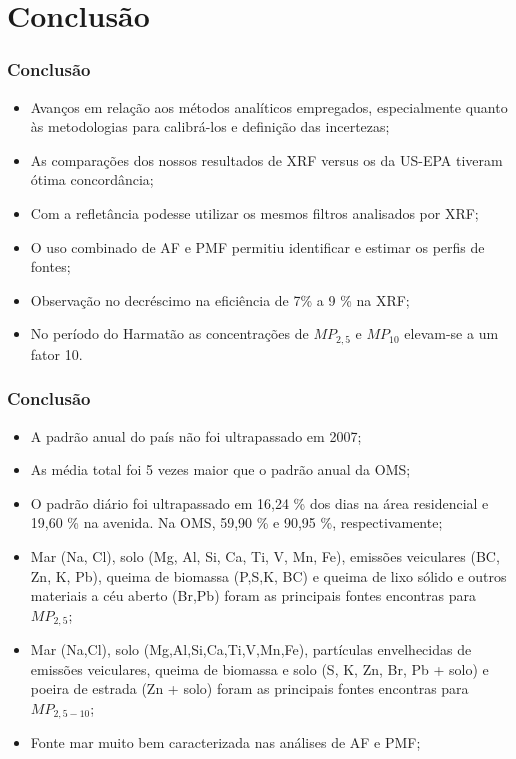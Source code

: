 \section{Conclusão}

\begin{frame}
  \frametitle{Conclusão}
  \begin{itemize}
    \item Avanços em relação aos métodos analíticos empregados, especialmente quanto às metodologias para calibrá-los e definição das incertezas;
    \item As comparações dos nossos resultados de XRF versus os da US-EPA tiveram ótima concordância;
    \item Com a refletância podesse utilizar os mesmos filtros analisados por XRF;
    \item O uso combinado de AF e PMF permitiu identificar e estimar os perfis de fontes;
    \item Observação no decréscimo na eficiência de 7\% a 9 \% na XRF;
        \item No período do Harmatão as concentrações de $MP_{2,5}$ e $MP_{10}$ elevam-se a um fator 10.
  \end{itemize}
\end{frame}

\begin{frame}
  \frametitle{Conclusão}
  \begin{itemize}
    \item A padrão anual do país não foi ultrapassado em 2007;
    \item As média total foi 5 vezes maior que o padrão anual da OMS;
    \item O padrão diário foi ultrapassado em 16,24 \% dos dias na área residencial e 19,60 \% na avenida. Na OMS, 59,90 \% e 90,95 \%, respectivamente;
    \item Mar (Na, Cl), solo (Mg, Al, Si, Ca, Ti, V, Mn, Fe), emissões veiculares (BC, Zn, K, Pb), queima de biomassa (P,S,K, BC) e queima de lixo sólido e outros materiais a céu aberto (Br,Pb) foram as principais fontes encontras para $MP_{2,5}$;
    \item Mar (Na,Cl), solo (Mg,Al,Si,Ca,Ti,V,Mn,Fe), partículas envelhecidas de emissões veiculares, queima de biomassa e solo (S, K, Zn, Br, Pb + solo) e poeira de estrada (Zn + solo) foram as principais fontes encontras para $MP_{2,5-10}$;
    \item Fonte mar muito bem caracterizada nas análises de AF e PMF;
  \end{itemize}
\end{frame}

